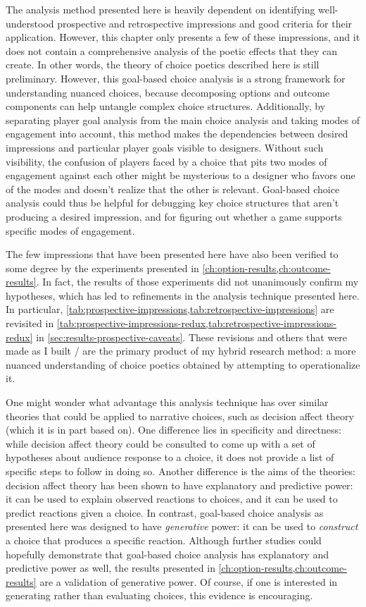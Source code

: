 The analysis method presented here is heavily dependent on identifying well-understood prospective and retrospective impressions and good criteria for their application.
%
However, this chapter only presents a few of these impressions, and it does not contain a comprehensive analysis of the poetic effects that they can create.
%
In other words, the theory of choice poetics described here is still preliminary.
%
However, this goal-based choice analysis is a strong framework for understanding nuanced choices, because decomposing options and outcome components can help untangle complex choice structures.
%
Additionally, by separating player goal analysis from the main choice analysis and taking modes of engagement into account, this method makes the dependencies between desired impressions and particular player goals visible to designers.
%
Without such visibility, the confusion of players faced by a choice that pits two modes of engagement against each other might be mysterious to a designer who favors one of the modes and doesn't realize that the other is relevant.
%
Goal-based choice analysis could thus be helpful for debugging key choice structures that aren't producing a desired impression, and for figuring out whether a game supports specific modes of engagement.


The few impressions that have been presented here have also been verified to some degree by the experiments presented in \cref{ch:option-results,ch:outcome-results}.
%
In fact, the results of those experiments did not unanimously confirm my hypotheses, which has led to refinements in the analysis technique presented here.
%
In particular, \cref{tab:prospective-impressions,tab:retrospective-impressions} are revisited in \cref{tab:prospective-impressions-redux,tab:retrospective-impressions-redux} in \cref{sec:results-prospective-caveats}.
%
These revisions and others that were made as I built \dunyazad/ are the primary product of my hybrid research method: a more nuanced understanding of choice poetics obtained by attempting to operationalize it.


One might wonder what advantage this analysis technique has over similar theories that could be applied to narrative choices, such as decision affect theory \citep{Mellers1997} (which it is in part based on).
%
One difference lies in specificity and directness: while decision affect theory could be consulted to come up with a set of hypotheses about audience response to a choice, it does not provide a list of specific steps to follow in doing so.
%
Another difference is the aims of the theories: decision affect theory has been shown to have explanatory and predictive power: it can be used to explain observed reactions to choices, and it can be used to predict reactions given a choice.
%
In contrast, goal-based choice analysis as presented here was designed to have \emph{generative} power: it can be used to \emph{construct} a choice that produces a specific reaction.
%
Although further studies could hopefully demonstrate that goal-based choice analysis has explanatory and predictive power as well, the results presented in \cref{ch:option-results,ch:outcome-results} are a validation of generative power.
%
Of course, if one is interested in generating rather than evaluating choices, this evidence is encouraging.


